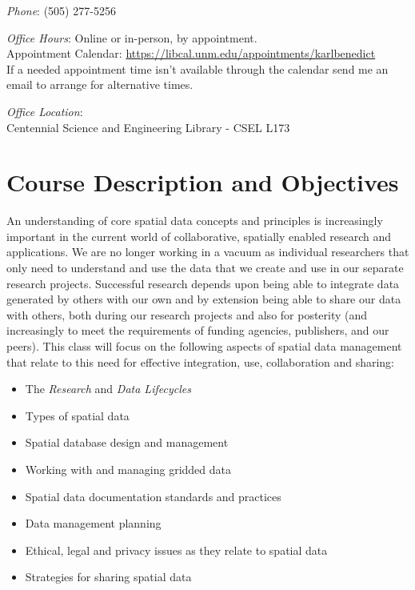 \documentclass[
]{article}
\providecommand{\tightlist}{%
  \setlength{\itemsep}{0pt}\setlength{\parskip}{0pt}}
\begin{document}
\emph{Phone}: (505) 277-5256

\emph{Office Hours}: Online or in-person, by appointment.\\
Appointment Calendar:
\url{https://libcal.unm.edu/appointments/karlbenedict}\\
If a needed appointment time isn't available through the calendar send
me an email to arrange for alternative times.

\emph{Office Location}:\\
Centennial Science and Engineering Library - CSEL L173

\hypertarget{course-description-and-objectives}{%
\section{Course Description and
Objectives}\label{course-description-and-objectives}}

An understanding of core spatial data concepts and principles is
increasingly important in the current world of collaborative, spatially
enabled research and applications. We are no longer working in a vacuum
as individual researchers that only need to understand and use the data
that we create and use in our separate research projects. Successful
research depends upon being able to integrate data generated by others
with our own and by extension being able to share our data with others,
both during our research projects and also for posterity (and
increasingly to meet the requirements of funding agencies, publishers,
and our peers). This class will focus on the following aspects of
spatial data management that relate to this need for effective
integration, use, collaboration and sharing:

\begin{itemize}
\tightlist
\item
  The \emph{Research} and \emph{Data Lifecycles}
\item
  Types of spatial data
\item
  Spatial database design and management
\item
  Working with and managing gridded data
\item
  Spatial data documentation standards and practices
\item
  Data management planning
\item
  Ethical, legal and privacy issues as they relate to spatial data
\item
  Strategies for sharing spatial data
\end{itemize}
\end{document}
